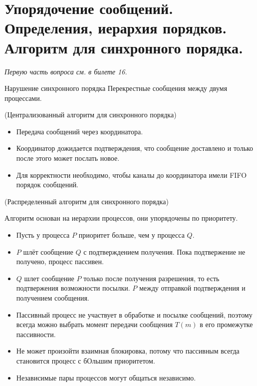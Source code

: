 \section{Упорядочение сообщений. Определения, иерархия порядков. Алгоритм для синхронного порядка.}

\textit{Первую часть вопроса см. в билете 16.}

\begin{example}{Нарушение синхронного порядка}
    Перекрестные сообщения между двумя процессами.
\end{example}

\begin{algorithm}(Централизованный алгоритм для синхронного порядка)

    \begin{itemize}
        \item Передача сообщений через координатора.
        \item Координатор дожидается подтверждения, что сообщение доставлено и только после этого может послать новое.
        \item Для корректности необходимо, чтобы каналы до координатора имели FIFO порядок сообщений.
    \end{itemize}
\end{algorithm}

\begin{algorithm}(Распределенный алгоритм для синхронного порядка)

    Алгоритм основан на иерархии процессов, они упорядочены по приоритету.
    \begin{itemize}
        \item Пусть у процесса $P$ приоритет больше, чем у процесса $Q$.
        \item $P$ шлёт сообщение $Q$ с подтверждением получения. Пока подтвержение не получено, процесс пассивен.
        \item $Q$ шлет сообщение $P$ только после получения разрешения, то есть подтвержения возможности посылки. $P$ между отправкой подтверждения и получением сообщения.
        \item Пассивный процесс не участвует в обработке и посылке сообщений, поэтому всегда можно выбрать момент передачи сообщения $T(m)$ в его промежутке пассивности.
        \item Не может произойти взаимная блокировка, потому что пассивным всегда становится процесс с бОльшим приоритетом.
        \item Независимые пары процессов могут общаться независимо.
    \end{itemize}

\end{algorithm}
